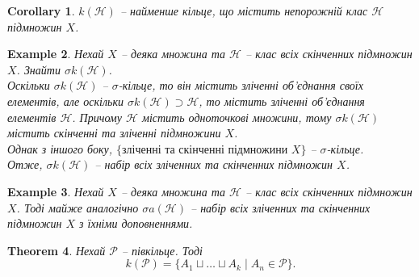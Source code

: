 \documentclass[a4paper, 10pt]{article}
\theoremstyle{theoremdd}
\newtheorem{theorem}{Theorem}[subsection]
\newtheorem{example}[theorem]{Example}
\newtheorem{corollary}[theorem]{Corollary}
\begin{document}
\begin{corollary}
$k(\mathcal{H})$ -- найменше кільце, що містить непорожній клас $\mathcal{H}$ підмножин $X$.
\end{corollary}

\begin{example}
Нехай $X$ -- деяка множина та $\mathcal{H}$ -- клас всіх скінченних підмножин $X$. Знайти $\sigma k(\mathcal{H})$.
\bigskip \\
Оскільки $\sigma k(\mathcal{H})$ -- $\sigma$-кільце, то він містить зліченні об'єднання своїх елементів, але оскільки $\sigma k(\mathcal{H}) \supset \mathcal{H}$, то містить зліченні об'єднання елементів $\mathcal{H}$. Причому $\mathcal{H}$ містить одноточкові множини, тому $\sigma k(\mathcal{H})$ містить скінченні та зліченні підмножини $X$.\\
Однак з іншого боку, $\{\text{зліченні та скінченні підмножини $X$}\}$ -- $\sigma$-кільце.\\
Отже, $\sigma k(\mathcal{H})$ -- набір всіх зліченних та скінченних підмножин $X$.
\end{example}

\begin{example}
Нехай $X$ -- деяка множина та $\mathcal{H}$ -- клас всіх скінченних підмножин $X$. Тоді майже аналогічно $\sigma a(\mathcal{H})$ -- набір всіх зліченних та скінченних підмножин $X$ з їхніми доповненнями.
\end{example}

\begin{theorem}
\label{ring_generated_by_semiring}
Нехай $\mathcal{P}$ -- півкільце. Тоді
\begin{equation}
\label{eq:ring_generated_by_a_semiring}
k(\mathcal{P}) = \{ A_1 \sqcup \dots \sqcup A_k \mid A_n \in \mathcal{P} \}.
\end{equation}
\end{theorem}
\end{document}
